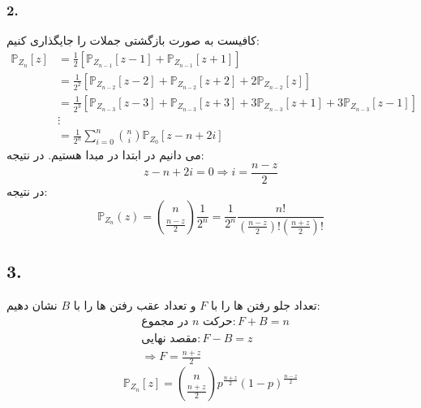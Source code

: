 \documentclass[]{article}
\begin{document}
	\subsubsection{2.}
	کافیست به صورت بازگشتی جملات را جایگذاری کنیم:
	\begin{equation}
		\nonumber
		\begin{split}
			\mathbb{P}_{Z_n}[z] &= \frac{1}{2} [\mathbb{P}_{Z_{n-1}}[z - 1] + \mathbb{P}_{Z_{n-1}}[z+1]]\\
			&=\frac{1}{2^2}[\mathbb{P}_{Z_{n-2}}[z - 2] + \mathbb{P}_{Z_{n-2}}[z+2] + 2\mathbb{P}_{Z_{n-2}}[z]]\\ 
			&=\frac{1}{2^3}[\mathbb{P}_{Z_{n-3}}[z - 3] + \mathbb{P}_{Z_{n-3}}[z+3] + 3\mathbb{P}_{Z_{n-3}}[z+1] + 3\mathbb{P}_{Z_{n-3}}[z-1]]\\
			&\vdots\\
			&=\frac{1}{2^n}\sum_{i = 0}^{n}\binom{n}{i}\mathbb{P}_{Z_0}[z - n + 2i] 
		\end{split}
	\end{equation}
	می دانیم در ابتدا در مبدا هستیم. در نتیجه:
	\begin{equation}
		\nonumber
		z - n + 2i = 0 \Rightarrow i = \frac{n - z}{2}
	\end{equation}
	در نتیجه:
	\begin{equation}
		\nonumber
		\mathbb{P}_{Z_n}(z) = \binom{n}{\frac{n-z}{2}} \frac{1}{2^n} = \frac{1}{2^n} \frac{n!}{(\frac{n-z}{2})!(\frac{n+z}{2})!} 
	\end{equation}
	\subsection{3.}
	تعداد جلو رفتن ها را با $F$ و تعداد عقب رفتن ها را با $B$ نشان دهیم:
	\begin{equation}
		\nonumber
		\begin{split}
			&\text{در مجموع $n$ حرکت} : F + B = n \\
			&\text{مقصد نهایی} : F - B = z\\
			&\Rightarrow F = \frac{n + z}{2}
		\end{split}
	\end{equation}
	\begin{equation}
		\nonumber
		\mathbb{P}_{Z_n}[z] = \binom{n}{\frac{n+z}{2}} p^{\frac{n+z}{2}} (1-p)^{\frac{n-z}{2}}
	\end{equation}
	\newpage
\end{document}
